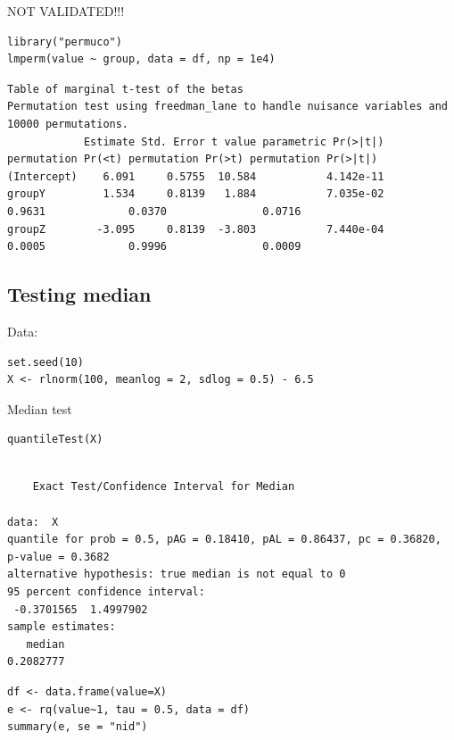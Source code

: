 \documentclass{article}
\begin{document}
NOT VALIDATED!!! 
\lstset{language=r,label= ,caption= ,captionpos=b,numbers=none}
\begin{lstlisting}
library("permuco")
lmperm(value ~ group, data = df, np = 1e4)
\end{lstlisting}

\begin{verbatim}
Table of marginal t-test of the betas
Permutation test using freedman_lane to handle nuisance variables and 10000 permutations.
            Estimate Std. Error t value parametric Pr(>|t|) permutation Pr(<t) permutation Pr(>t) permutation Pr(>|t|)
(Intercept)    6.091     0.5755  10.584           4.142e-11                                                           
groupY         1.534     0.8139   1.884           7.035e-02             0.9631             0.0370               0.0716
groupZ        -3.095     0.8139  -3.803           7.440e-04             0.0005             0.9996               0.0009
\end{verbatim}

\subsection{Testing median}
\label{sec:orga69fad6}

Data:
\lstset{language=r,label= ,caption= ,captionpos=b,numbers=none}
\begin{lstlisting}
set.seed(10)
X <- rlnorm(100, meanlog = 2, sdlog = 0.5) - 6.5
\end{lstlisting}

Median test
\lstset{language=r,label= ,caption= ,captionpos=b,numbers=none}
\begin{lstlisting}
quantileTest(X)
\end{lstlisting}

\begin{verbatim}

	Exact Test/Confidence Interval for Median

data:  X
quantile for prob = 0.5, pAG = 0.18410, pAL = 0.86437, pc = 0.36820, p-value = 0.3682
alternative hypothesis: true median is not equal to 0
95 percent confidence interval:
 -0.3701565  1.4997902
sample estimates:
   median 
0.2082777
\end{verbatim}

\lstset{language=r,label= ,caption= ,captionpos=b,numbers=none}
\begin{lstlisting}
df <- data.frame(value=X)
e <- rq(value~1, tau = 0.5, data = df)
summary(e, se = "nid")
\end{lstlisting}
\end{document}
